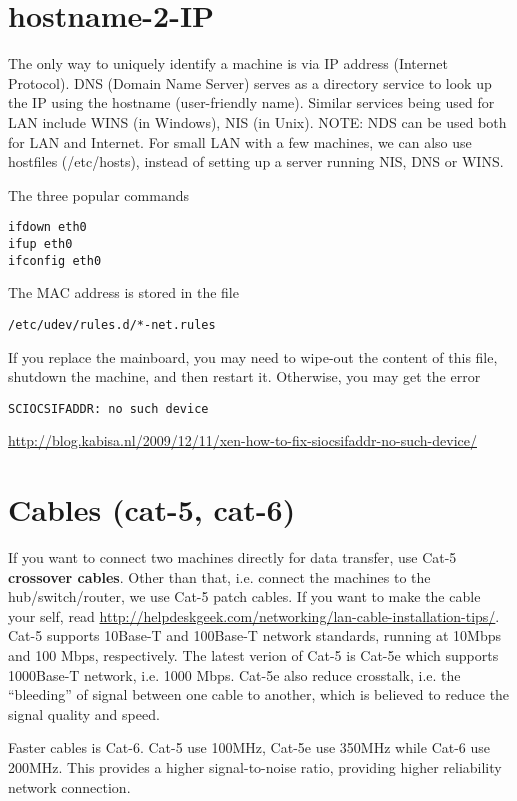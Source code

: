 \section{hostname-2-IP}

The only way to uniquely identify a machine is via IP address (Internet
Protocol). DNS (Domain Name Server) serves as a directory service to look up the
IP using the hostname (user-friendly name). Similar services being used
for LAN include WINS (in Windows), NIS (in Unix). NOTE: NDS can be used both for
LAN and Internet. For small LAN with a few machines, we can also use hostfiles
(/etc/hosts), instead of setting up a server running NIS, DNS or WINS.

The three popular commands
\begin{verbatim}
ifdown eth0
ifup eth0
ifconfig eth0
\end{verbatim}
The MAC address is stored in the file
\begin{verbatim}
/etc/udev/rules.d/*-net.rules
\end{verbatim}
If you replace the mainboard, you may need to wipe-out the content of this file,
shutdown the machine, and then restart it. Otherwise, you may get the error
\begin{verbatim}
SCIOCSIFADDR: no such device
\end{verbatim}
\url{http://blog.kabisa.nl/2009/12/11/xen-how-to-fix-siocsifaddr-no-such-device/}

\section{Cables (cat-5, cat-6)}
\label{sec:cable}

If you want to connect two machines directly for data transfer, use Cat-5 {\bf
crossover cables}. Other than that, i.e. connect the machines to the
hub/switch/router, we use Cat-5 patch cables. If you want to make the cable your
self, read
\url{http://helpdeskgeek.com/networking/lan-cable-installation-tips/}. Cat-5
supports 10Base-T and 100Base-T network standards, running at 10Mbps and 100
Mbps, respectively. The latest verion of Cat-5 is Cat-5e which supports
1000Base-T network, i.e. 1000 Mbps. Cat-5e also reduce crosstalk, i.e. the
``bleeding'' of signal between one cable to another, which is believed to reduce
the signal quality and speed. 


Faster cables is Cat-6. Cat-5 use 100MHz, Cat-5e use 350MHz while Cat-6 use
200MHz. This provides a higher signal-to-noise ratio, providing higher
reliability network connection.


